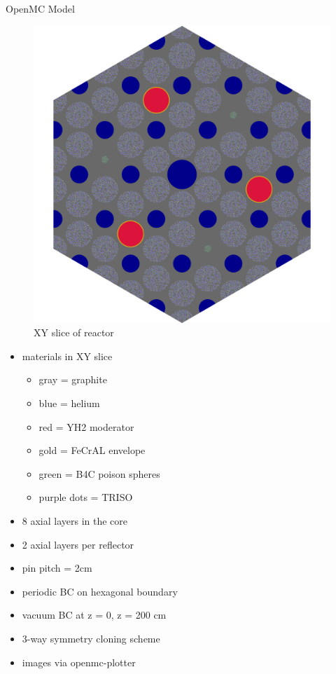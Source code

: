 \documentclass[9pt,t,aspectratio=169]{beamer}
\begin{document}
\begin{frame}{OpenMC Model}
\begin{minipage}[t]{0.365\linewidth}
\begin{figure}
            \includegraphics[height=0.7\textheight]{figures/gcmr_slice.png}
            \caption{XY slice of reactor}
        \end{figure}
    \end{minipage}
    \hfill%
    \begin{minipage}[t]{0.385\linewidth}
        \begin{itemize}
        \item materials in XY slice
        \begin{itemize}
            \item gray = graphite
            \item blue = helium
            \item red = YH2 moderator
            \item gold = FeCrAL envelope
            \item green = B4C poison spheres
            \item purple dots = TRISO
        \end{itemize}
        \item 8 axial layers in the core
        \item 2 axial layers per reflector
        \item pin pitch = 2cm
        \item periodic BC on hexagonal boundary
        \item vacuum BC at z = 0, z = 200 cm
        \item 3-way symmetry cloning scheme
        \item images via openmc-plotter
        \end{itemize}
    \end{minipage}
\end{frame}
\end{document}
